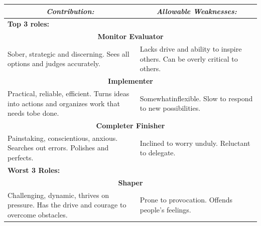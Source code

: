 \begin{table}[ht]
\centering
\begin{tabular}{|p{}|p{}|}
\hline
\multicolumn{1}{|c|}{\textit{Contribution:}}                                                  & \multicolumn{1}{c|}{\textit{Allowable Weaknesses:}}                          \\ \hline
\multicolumn{2}{|l|}{\textbf{Top 3 roles:}}                                                                                                                                  \\ \hline
\multicolumn{2}{|c|}{\textbf{Monitor Evaluator}}                                                                                                                             \\ \hline
Sober, strategic and discerning. Sees all options and judges accurately.                      & Lacks drive and ability to inspire others. Can be overly critical to others. \\ \hline
\multicolumn{2}{|c|}{\textbf{Implementer}}                                                                                                                                   \\ \hline
Practical, reliable, efficient. Turns ideas into actions and organizes work that needs tobe done.& Somewhatinflexible. Slow to respond to new possibilities.                  \\ \hline
\multicolumn{2}{|c|}{\textbf{Completer Finisher}}                                                                                                                            \\ \hline
Painstaking, conscientious, anxious. Searches out errors. Polishes and perfects.              & Inclined to worry unduly. Reluctant to delegate.                             \\ \hline
\multicolumn{2}{|l|}{\textbf{Worst 3 Roles:}}                                                                                                                                \\ \hline
\multicolumn{2}{|c|}{\textbf{Shaper}}                                                                                                                                        \\ \hline
Challenging, dynamic, thrives on pressure. Has the drive and courage to overcome obstacles. & Prone to provocation. Offends people’s feelings.                             \\ \hline

\end{tabular}
\end{table}

